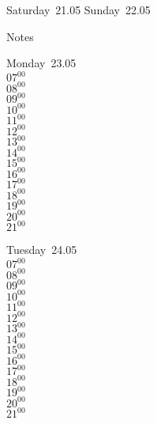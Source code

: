 \documentclass[11pt,a4paper]{book}\usepackage[]{graphicx}\usepackage[]{color}
\begin{document}
\begin{weekendbox}
  Saturday~21.05
  \tcblower
  Sunday~22.05
\end{weekendbox} %
\begin{notebox}
  Notes
\end{notebox}
\clearpage
\begin{headerbox}
\end{headerbox}
\begin{weekdaybox}
  Monday~23.05\\
  { 
  \vfill
  $07^{00}$\\
$08^{00}$\\
$09^{00}$\\
$10^{00}$\\
$11^{00}$\\
$12^{00}$\\
$13^{00}$\\
$14^{00}$\\
$15^{00}$\\
$16^{00}$\\
$17^{00}$\\
$18^{00}$\\
$19^{00}$\\
$20^{00}$\\
$21^{00}$\\
  }
\end{weekdaybox}
\begin{weekdaybox}
  Tuesday~24.05\\
  { 
  \vfill
  $07^{00}$\\
$08^{00}$\\
$09^{00}$\\
$10^{00}$\\
$11^{00}$\\
$12^{00}$\\
$13^{00}$\\
$14^{00}$\\
$15^{00}$\\
$16^{00}$\\
$17^{00}$\\
$18^{00}$\\
$19^{00}$\\
$20^{00}$\\
$21^{00}$\\
  }
\end{weekdaybox}
\end{document}
